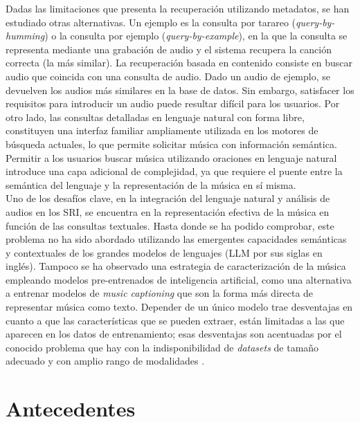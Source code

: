 Dadas las limitaciones que presenta la recuperación utilizando metadatos, se han estudiado otras alternativas. Un ejemplo es la consulta por tarareo (\textit{query-by-humming}) o la consulta por ejemplo (\textit{query-by-example}), en la que la consulta se representa mediante una grabación de audio y el sistema recupera la canción correcta (la más similar). La recuperación basada en contenido consiste en buscar audio que coincida con una consulta de audio. Dado un audio de ejemplo, se devuelven los audios más similares en la base de datos. Sin embargo, satisfacer los requisitos para introducir un audio puede resultar difícil para los usuarios. Por otro lado, las consultas detalladas en lenguaje natural con forma libre, constituyen una interfaz familiar ampliamente utilizada en los motores de búsqueda actuales, lo que permite solicitar música con información semántica.\\
Permitir a los usuarios buscar música utilizando oraciones en lenguaje natural introduce una capa adicional de complejidad, ya que requiere el puente entre la semántica del lenguaje y la representación de la música en sí misma.\\
Uno de los desafíos clave, en la integración del lenguaje natural y análisis de audios en los SRI, se encuentra en la representación efectiva de la música en función de las consultas textuales. Hasta donde se ha podido comprobar, este problema no ha sido abordado utilizando las emergentes capacidades semánticas y contextuales de los grandes modelos de lenguajes (LLM por sus siglas en inglés). Tampoco se ha observado una estrategia de caracterización de la música empleando modelos pre-entrenados de inteligencia artificial, como una alternativa a entrenar modelos de \textit{music captioning} que son la forma más directa de representar música como texto. Depender de un único modelo trae desventajas en cuanto a que las características que se pueden extraer, están limitadas a las que aparecen en los datos de entrenamiento; esas desventajas son acentuadas por el conocido problema que hay con la indisponibilidad de \textit{datasets} de tamaño adecuado y con amplio rango de modalidades \cite{Simonetta2019MultimodalMI}. \\

\section{Antecedentes}
\label{sec:anteced}


